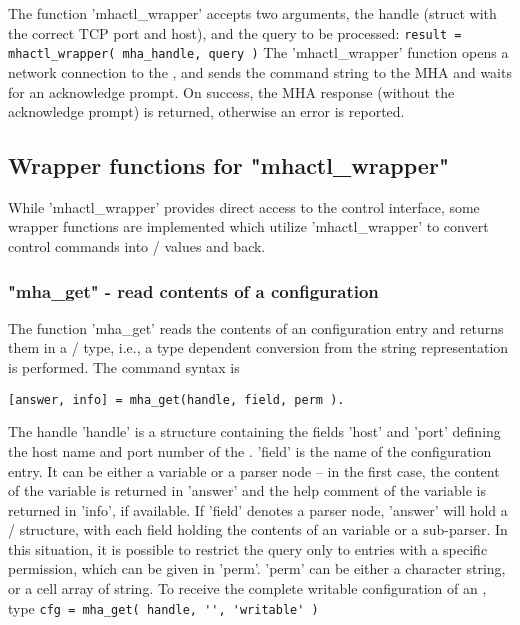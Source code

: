 The function 'mhactl\_wrapper' accepts two arguments, the \mha{} handle 
(struct with the correct TCP port and host), and the \mha{} query to be processed:
\verb!result = mhactl_wrapper( mha_handle, query )!
%
The 'mhactl\_wrapper' function opens a network connection to the \mhad{},
and sends the command string to the MHA and waits for an acknowledge
prompt.
%
On success, the MHA response (without the acknowledge prompt) is
returned, otherwise an error is reported.

\subsection{Wrapper functions for "mhactl\_wrapper"}
\label{sec:mhactl_wrapper}

While 'mhactl\_wrapper' provides direct access to the \mha{} control interface,
some wrapper functions are implemented which utilize 'mhactl\_wrapper' to
convert \mha{} control commands into \Octave{}/\Matlab{} values and back.

\subsubsection{"mha\_get" - read contents of a \mha configuration}

The function 'mha\_get' reads the contents of an \mha{} configuration
entry and returns them in a \Octave{}/\Matlab{} type, i.e., a type dependent
conversion from the \mha{} string representation is performed. The
command syntax is
\begin{verbatim}
[answer, info] = mha_get(handle, field, perm ).
\end{verbatim}
The \mha{} handle 'handle' is a structure containing the fields 'host'
and 'port' defining the host name and port number of the \mhad{}.
%
'field' is the name of the \mha{} configuration entry.
%
It can be either a variable or a parser node -- in the first case, the
content of the variable is returned in 'answer' and the help comment
of the variable is returned in 'info', if available.
%
If 'field' denotes a parser node, 'answer' will hold a \Octave{}/\Matlab{}
structure, with each field holding the contents of an \mha{} variable or a
sub-parser.
%
In this situation, it is possible to restrict the query only to
entries with a specific permission, which can be given in 'perm'.
%
'perm' can be either a character string, or a cell array of string.
%
To receive the complete writable configuration of an \mhad{}, type
\verb!cfg = mha_get( handle, '', 'writable' )!
%

